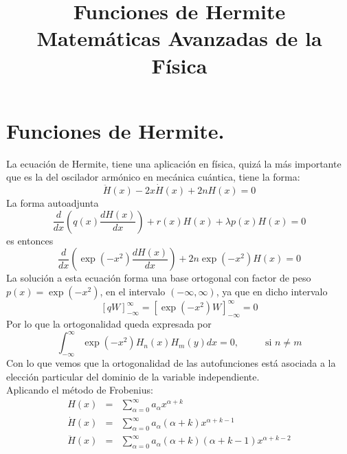 
\usepackage{mathrsfs}
\usepackage{bigints}
\title{Funciones de Hermite \\ {\large Matemáticas Avanzadas de la Física}}
\date{ }

\renewcommand\labelenumii{\theenumi.{\arabic{enumii}}}
\maketitle
\fontsize{14}{14}\selectfont
\section{Funciones de Hermite.}
La ecuación de Hermite, tiene una aplicación en física, quizá la más importante que es la del oscilador armónico en mecánica cuántica, tiene la forma:
\begin{equation}
\ddot{H}(x) - 2 x \dot{H}(x) + 2n H(x) = 0
\label{eq:ecuacion_001}
\end{equation}
La forma autoadjunta
\[ \dfrac{d}{dx} \left( q(x) \dfrac{d H(x)}{dx} \right) + r(x) H(x) + \lambda p(x) H(x) = 0 \]
es entonces
\begin{equation}
\dfrac{d}{dx} \left( \exp(-x^{2}) \dfrac{d H(x)}{dx} \right) + 2n \exp(-x^{2}) H(x) = 0
\label{eq:ecuacion_002}
\end{equation}
La solución a esta ecuación forma una base ortogonal con factor de peso $p(x) = \exp(-x^{2})$, en el intervalo $(-\infty, \infty)$, ya que en dicho intervalo
\[ [q W]_{-\infty}^{\infty} = [ \exp(-x^{2}) W ]_{-\infty}^{\infty} = 0 \]
Por lo que la ortogonalidad queda expresada por
\[ \int_{-\infty}^{\infty} \exp(-x^{2}) H_{n}(x) H_{m}(y) dx = 0, \hspace{1cm} \mbox{ si } n \neq m \]
Con lo que vemos que la ortogonalidad de las autofunciones está asociada a la elección particular del dominio de la variable independiente.
\\
Aplicando el método de Frobenius:
\begin{eqnarray}
H(x) &=& \sum_{\alpha = 0}^{\infty} a_{\alpha} x^{\alpha + k} \nonumber \\
\dot{H}(x) &=& \sum_{\alpha = 0}^{\infty} a_{\alpha}(\alpha + k) x^{\alpha + k-1} \nonumber \\
\ddot{H}(x) &=& \sum_{\alpha = 0}^{\infty} a_{\alpha}(\alpha + k)(\alpha + k - 1) x^{\alpha + k-2} \nonumber
\end{eqnarray}
